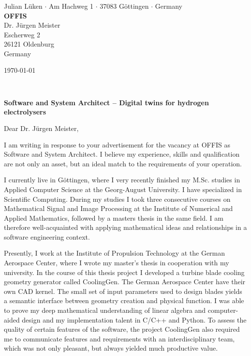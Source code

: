 \documentclass[a4paper, 10pt]{article}
\newcommand{\myFirstName}{Julian}
\newcommand{\myLastName}{Lüken}
\newcommand{\myStreet}{Am Hachweg 1}
\newcommand{\myCity}{37083 Göttingen}
\newcommand{\myCountry}{Germany}
\newcommand{\myRecipient}{
		\textbf{OFFIS}\\
		Dr. Jürgen Meister\\
		Escherweg 2\\
		26121 Oldenburg\\
		Germany
}
\newcommand{\myName}{\myFirstName{} \myLastName}
\newcommand{\myHalfSpace}{1em}
\begin{document}
\begin{center}

	\noindent
	\begin{minipage}{\textwidth}
		\flushleft
		\scriptsize \myName{} $\cdot$ \myStreet{} $\cdot$ \myCity{} $\cdot$ \myCountry\\
		\normalsize \myRecipient
	\end{minipage}

	\vspace{4em}
	\flushright
	\begin{minipage}{\textwidth}
		\flushright
		\today
	\end{minipage}\\[\myHalfSpace]
	\flushleft
	\begin{minipage}{\textwidth}
		\flushleft
		\textbf{Software and System Architect -- Digital twins for hydrogen electrolysers}
	\end{minipage}
\end{center}
\setlength{\parindent}{0pt}
\vspace{\myHalfSpace}
Dear Dr. Jürgen Meister,

I am writing in response to your advertisement for the vacancy at OFFIS as Software and System Architect. I believe my experience, skills and qualification are not only an asset, but an ideal match to the requirements of your operation.

I currently live in Göttingen, where I very recently finished my M.Sc. studies in Applied Computer Science at the Georg-August University. I have specialized in Scientific Computing. During my studies I took three consecutive courses on Mathematical Signal and Image Processing at the Institute of Numerical and Applied Mathematics, followed by a masters thesis in the same field. I am therefore well-acquainted with applying mathematical ideas and relationships in a software engineering context.

Presently, I work at the Institute of Propulsion Technology at the German Aerospace Center, where I wrote my master's thesis in cooperation with my university. In the course of this thesis project I developed a turbine blade cooling geometry generator called CoolingGen. The German Aerospace Center have their own CAD kernel. The small set of input parameters used to design blades yields a semantic interface between geometry creation and physical function. I was able to prove my deep mathematical understanding of linear algebra and computer-aided design and my implementation talent in C/C++ and Python. To assess the quality of certain features of the software, the project CoolingGen also required me to communicate features and requirements with an interdisciplinary team, which was not only pleasant, but always yielded much productive value. 
\end{document}
